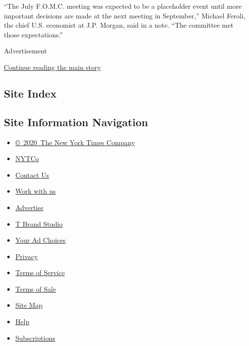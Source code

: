 ``The July F.O.M.C. meeting was expected to be a placeholder event until
more important decisions are made at the next meeting in September,''
Michael Feroli, the chief U.S. economist at J.P. Morgan, said in a note.
``The committee met those expectations.''

Advertisement

\protect\hyperlink{after-bottom}{Continue reading the main story}

\hypertarget{site-index}{%
\subsection{Site Index}\label{site-index}}

\hypertarget{site-information-navigation}{%
\subsection{Site Information
Navigation}\label{site-information-navigation}}

\begin{itemize}
\tightlist
\item
  \href{https://help.nytimes3xbfgragh.onion/hc/en-us/articles/115014792127-Copyright-notice}{©~2020~The
  New York Times Company}
\end{itemize}

\begin{itemize}
\tightlist
\item
  \href{https://www.nytco.com/}{NYTCo}
\item
  \href{https://help.nytimes3xbfgragh.onion/hc/en-us/articles/115015385887-Contact-Us}{Contact
  Us}
\item
  \href{https://www.nytco.com/careers/}{Work with us}
\item
  \href{https://nytmediakit.com/}{Advertise}
\item
  \href{http://www.tbrandstudio.com/}{T Brand Studio}
\item
  \href{https://www.nytimes3xbfgragh.onion/privacy/cookie-policy\#how-do-i-manage-trackers}{Your
  Ad Choices}
\item
  \href{https://www.nytimes3xbfgragh.onion/privacy}{Privacy}
\item
  \href{https://help.nytimes3xbfgragh.onion/hc/en-us/articles/115014893428-Terms-of-service}{Terms
  of Service}
\item
  \href{https://help.nytimes3xbfgragh.onion/hc/en-us/articles/115014893968-Terms-of-sale}{Terms
  of Sale}
\item
  \href{https://spiderbites.nytimes3xbfgragh.onion}{Site Map}
\item
  \href{https://help.nytimes3xbfgragh.onion/hc/en-us}{Help}
\item
  \href{https://www.nytimes3xbfgragh.onion/subscription?campaignId=37WXW}{Subscriptions}
\end{itemize}
